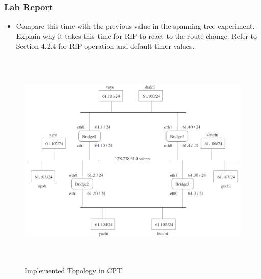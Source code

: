\documentclass[10pt,a4paper]{article}
\numberwithin{equation}{section}
\numberwithin{figure}{section}
\numberwithin{table}{section}
\begin{document}
\subsubsection*{ Lab Report}
\begin{itemize}
	\setlength{\itemindent}{0pt}
	\item Compare this time with the previous value in the spanning tree experiment. Explain why it takes this time for RIP to react to the route change. Refer to Section 4.2.4 for RIP operation and default timer values.
\end{itemize}

\begin{figure}[H]
	\centering
    \includegraphics[height=300pt]{img/fig4.png}
    \caption{Implemented Topology in CPT}
\label{fig:Topo}
\end{figure}
\end{document}
